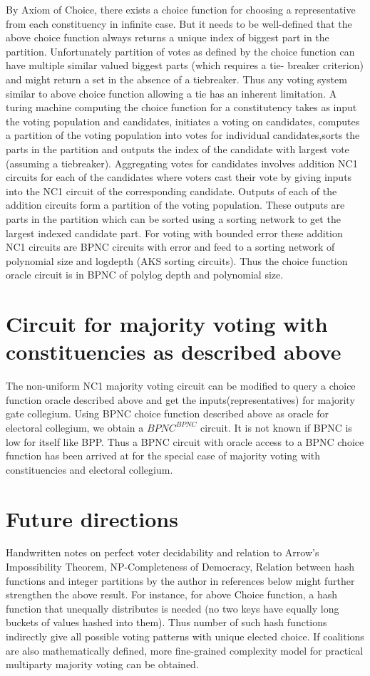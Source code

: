 \documentclass[11pt,onecolumn]{article}
\begin{document}
By Axiom of Choice, there exists a choice function for choosing a representative from each
constituency in infinite case. But it needs to be well-defined that the above choice function always
returns a unique index of biggest part in the partition. Unfortunately partition of votes as defined
by the choice function can have multiple similar valued biggest parts (which requires a tie-
breaker criterion) and might return a set in the absence of a tiebreaker. Thus any voting system
similar to above choice function allowing a tie has an inherent limitation.
A turing machine computing the choice function for a constitutency takes as input the voting
population and candidates, initiates a voting on candidates, computes a partition of the voting
population into votes for individual candidates,sorts the parts in the partition and outputs the
index of the candidate with largest vote (assuming a tiebreaker). Aggregating votes for
candidates involves addition NC1 circuits for each of the candidates where voters cast their
vote by giving inputs into the NC1 circuit of the corresponding candidate. Outputs of each of the
addition circuits form a partition of the voting population. These outputs are parts in the
partition which can be sorted using a sorting network to get the largest indexed candidate part.
For voting with bounded error these addition NC1 circuits are BPNC circuits with error and feed
to a sorting network of polynomial size and logdepth (AKS sorting circuits). Thus the choice
function oracle circuit is in BPNC of polylog depth and polynomial size.

\section{Circuit for majority voting with constituencies as described above}
The non-uniform NC1 majority voting circuit can be modified to query a choice function oracle
described above and get the inputs(representatives) for majority gate collegium. Using BPNC
choice function described above as oracle for electoral collegium, we obtain a $BPNC^{BPNC}$
circuit. It is not known if BPNC is low for itself like BPP. Thus a BPNC circuit with oracle access
to a BPNC choice function has been arrived at for the special case of majority voting with
constituencies and electoral collegium.

\section{Future directions}
Handwritten notes on perfect voter decidability and relation to Arrow's Impossibility Theorem, NP-Completeness of Democracy, Relation between hash functions and integer partitions by the author in references below might further strengthen the above result. For instance, for above Choice function, a hash function that unequally distributes is needed (no two keys have equally long buckets of values hashed into them). Thus number of such hash functions indirectly give all possible voting patterns with unique elected choice. If coalitions are also mathematically defined, more fine-grained complexity model for practical multiparty majority voting can be obtained. 
\end{document}
